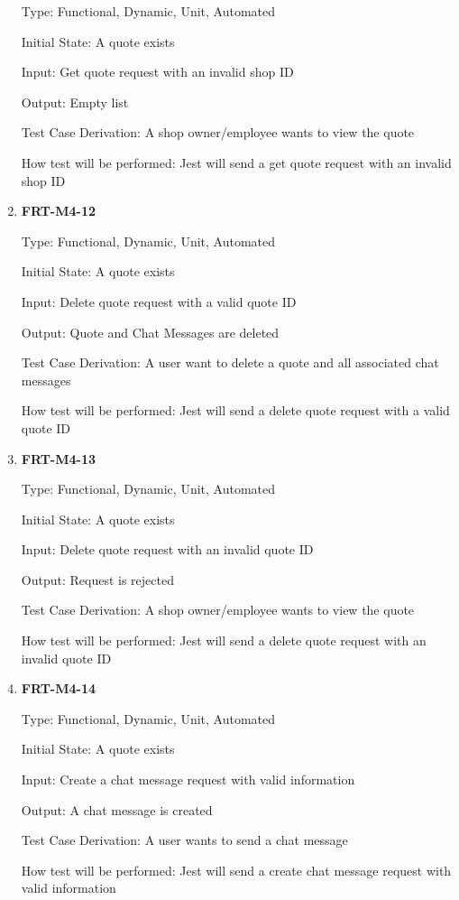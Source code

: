 \documentclass[12pt, titlepage]{article}
\begin{document}
\begin{enumerate}
	      Type: Functional, Dynamic, Unit, Automated

	      Initial State: A quote exists

	      Input: Get quote request with an invalid shop ID

	      Output: Empty list

	      Test Case Derivation: A shop owner/employee wants to view the quote

	      How test will be performed: Jest will send a get quote request with an invalid shop ID

	\item \textbf{FRT-M4-12}

	      Type: Functional, Dynamic, Unit, Automated

	      Initial State: A quote exists

	      Input: Delete quote request with a valid quote ID

	      Output: Quote and Chat Messages are deleted

	      Test Case Derivation: A user want to delete a quote and all associated chat messages

	      How test will be performed: Jest will send a delete quote request with a valid quote ID

	\item \textbf{FRT-M4-13}

	      Type: Functional, Dynamic, Unit, Automated

	      Initial State: A quote exists

	      Input: Delete quote request with an invalid quote ID

	      Output: Request is rejected

	      Test Case Derivation: A shop owner/employee wants to view the quote

	      How test will be performed: Jest will send a delete quote request with an invalid quote ID

	\item \textbf{FRT-M4-14}

	      Type: Functional, Dynamic, Unit, Automated

	      Initial State: A quote exists

	      Input: Create a chat message request with valid information

	      Output: A chat message is created

	      Test Case Derivation: A user wants to send a chat message

	      How test will be performed: Jest will send a create chat message request with valid information


\end{enumerate}
\end{document}
